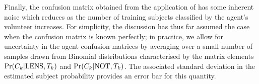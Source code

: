 \documentclass[useAMS,usenatbib,a4paper]{mn2e}
\begin{document}
Finally, the confusion matrix obtained from the application of
 has some inherent noise which reduces as the
number of training subjects classified by the agent's volunteer
increases. For simplicity, the discussion has thus far assumed the case
when the confusion matrix is known perfectly; in practice, we allow for
uncertainty in the agent confusion matrices by averaging over a small
number of samples drawn from Binomial distributions characterised by the
matrix elements ${\rm Pr}(C_k|{\rm LENS},T_k)$ and  ${\rm Pr}(C_k|{\rm NOT},T_k)$. The
associated standard deviation in the estimated subject probability
provides an error bar for this quantity.

% 





% 






\label{lastpage}
\bsp
\end{document}
